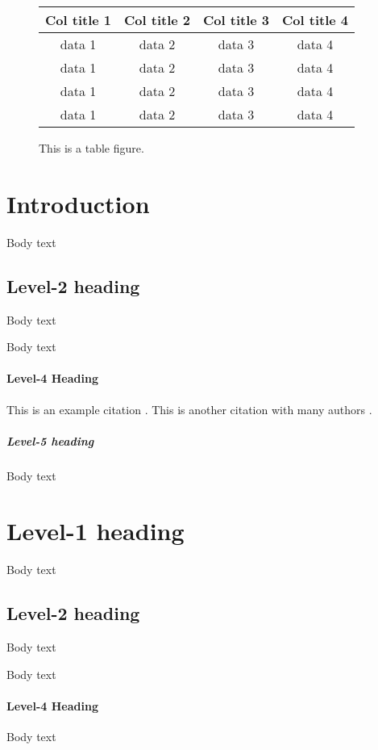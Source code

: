 \documentclass{hcij}
\begin{document}
\thickhrrule

\articlebodystart

\begin{figure}[b]
\caption{This is a table figure.}
\begin{tabular}{cccc}
\toprule
Col title 1 & Col title 2 & Col title 3 & Col title 4 \\
\midrule 
data 1 & data 2 & data 3 & data 4 \\
data 1 & data 2 & data 3 & data 4 \\
data 1 & data 2 & data 3 & data 4 \\
data 1 & data 2 & data 3 & data 4 \\
\bottomrule
\end{tabular}
\label{fig:testTablefigure}
\end{figure}

\section{Introduction}
Body text

\subsection{Level-2 heading}
Body text

Body text

\paragraph{Level-4 Heading}
This is an example citation \cite{Doe2014}. This is another citation with many authors \cite{Davis2007}.

\subparagraph{Level-5 heading}
Body text

\section{Level-1 heading}
Body text

\subsection{Level-2 heading}
Body text

Body text

\paragraph{Level-4 Heading}
Body text
\end{document}
